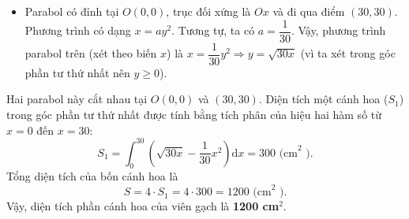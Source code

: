 \begin{bt}
{\begin{itemize}
			Phương trình có dạng $y=ax^2$. Thay tọa độ điểm  $(30{,}30)$ vào, ta có: $30 = a \cdot 30^2 \Rightarrow a=\dfrac{1}{30}$.
			 Vậy, phương trình parabol dưới là $y=\dfrac{1}{30}x^2$.
			\item Parabol có đỉnh tại $O(0{,}0)$,  trục đối xứng là $Ox$ và đi qua điểm $(30, 30)$.
			Phương trình có dạng $x=ay^2$. Tương tự, ta có $a=\dfrac{1}{30}$. 
			Vậy, phương trình parabol trên (xét theo biến $x$) là  $x=\dfrac{1}{30}y^2 \Rightarrow y = \sqrt{30x}$ (vì ta xét trong góc phần tư thứ nhất nên $y \ge 0$).
		\end{itemize}
		Hai  parabol này cắt nhau tại $O(0{,}0)$ và $(30{,}30)$.
		Diện tích một cánh hoa ($S_1$) trong góc phần tư thứ nhất được tính bằng tích phân của  hiệu hai hàm số từ $x=0$ đến $x=30$:
		$$ S_1 = \int_{0}^{30} \left(\sqrt{30x}  - \frac{1}{30}x^2\right) \mathrm{d}x = 300 \text{ (cm}^2\text{ )} .$$
		Tổng diện tích của bốn  cánh hoa là
		 $$ S = 4 \cdot S_1 = 4 \cdot 300 = 1200 \text{ (cm}^2\text{ )}. $$
		 Vậy, diện tích phần cánh hoa của viên gạch là \textbf{1200 cm$^2$}.
	} 
\end{bt}

